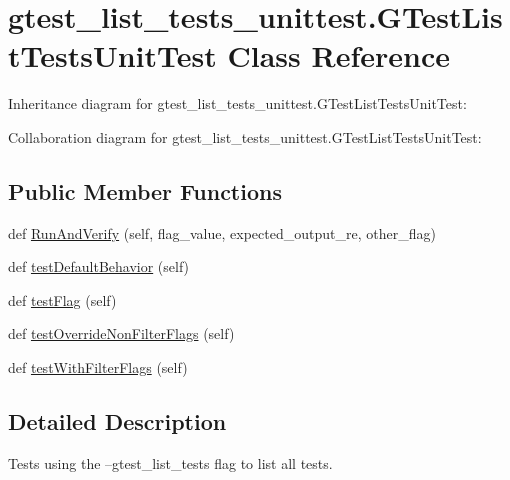 \hypertarget{classgtest__list__tests__unittest_1_1_g_test_list_tests_unit_test}{}\section{gtest\+\_\+list\+\_\+tests\+\_\+unittest.\+G\+Test\+List\+Tests\+Unit\+Test Class Reference}
\label{classgtest__list__tests__unittest_1_1_g_test_list_tests_unit_test}


Inheritance diagram for gtest\+\_\+list\+\_\+tests\+\_\+unittest.\+G\+Test\+List\+Tests\+Unit\+Test\+:


Collaboration diagram for gtest\+\_\+list\+\_\+tests\+\_\+unittest.\+G\+Test\+List\+Tests\+Unit\+Test\+:
\subsection*{Public Member Functions}
\begin{DoxyCompactItemize}
\item 
def \hyperlink{classgtest__list__tests__unittest_1_1_g_test_list_tests_unit_test_a965601cd1882fdeca94d2461bd033c40}{Run\+And\+Verify} (self, flag\+\_\+value, expected\+\_\+output\+\_\+re, other\+\_\+flag)
\item 
def \hyperlink{classgtest__list__tests__unittest_1_1_g_test_list_tests_unit_test_a4168d086b7ec31f86ab548b6fd79b27e}{test\+Default\+Behavior} (self)
\item 
def \hyperlink{classgtest__list__tests__unittest_1_1_g_test_list_tests_unit_test_a6d3e8738bd4b7494867cac464d342944}{test\+Flag} (self)
\item 
def \hyperlink{classgtest__list__tests__unittest_1_1_g_test_list_tests_unit_test_ae1ccba3f21c8e25968834607f7db2b10}{test\+Override\+Non\+Filter\+Flags} (self)
\item 
def \hyperlink{classgtest__list__tests__unittest_1_1_g_test_list_tests_unit_test_ac5bef6c9fb78b8eef84427de811fd70f}{test\+With\+Filter\+Flags} (self)
\end{DoxyCompactItemize}


\subsection{Detailed Description}
\begin{DoxyVerb}Tests using the --gtest_list_tests flag to list all tests.\end{DoxyVerb}
 

